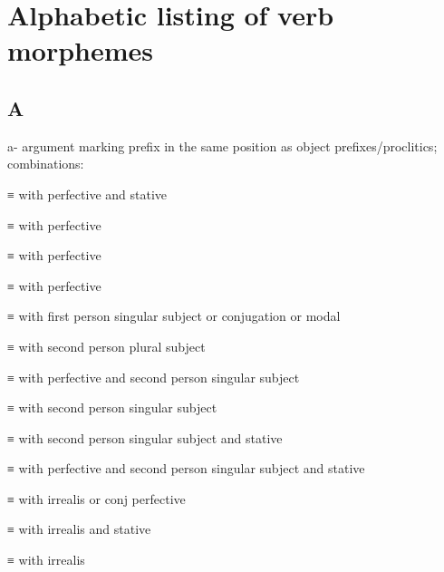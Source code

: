 
\section{Alphabetic listing of verb morphemes}\label{sec:alphalist}

\subsection{A}\label{sec:alphalist-a}
\raggedright
\begin{morphdesc}[series=alphalist]
\item[a-]\label{m:a-}
	argument marking prefix in the same position as object prefixes/proclitics;
	\newline
	combinations:
	\begin{allolist}
	\item[\X{aawa}]	≡  with perfective  and stative 
	\item[\X{am}]	≡  with perfective 
	\item[\X{aw}]	≡  with perfective 
	\item[\X{awu}]	≡  with perfective 
	\item[\X{ax̱}]	≡  with first person singular subject 
				or  conjugation 
				or modal 
	\item[{\X[aÿ-a-ÿ]{aÿ}}]
			≡  with second person plural subject 
	\item[{\X[aÿ-a-ʷ-ÿ]{aÿ}}]
			≡  with perfective 
				and second person singular subject 
	\item[\X{ee}]	≡  with second person singular subject 
	\item[{\X[eeÿa-a-i-ÿa]{eeÿa}}]
			≡  with second person singular subject 
				and stative 
	\item[{\X[eeÿa-a-ʷ-i-ÿa]{eeÿa}}]
			≡  with perfective 
				and second person singular subject 
				and stative 
	\item[\X{oo}]	≡  with irrealis 
				or  conj perfective 
	\item[\X{oowa}]	≡  with irrealis 
				and stative 
	\item[\X{oox̱}]	≡  with irrealis 

\end{allolist}
\end{morphdesc}
